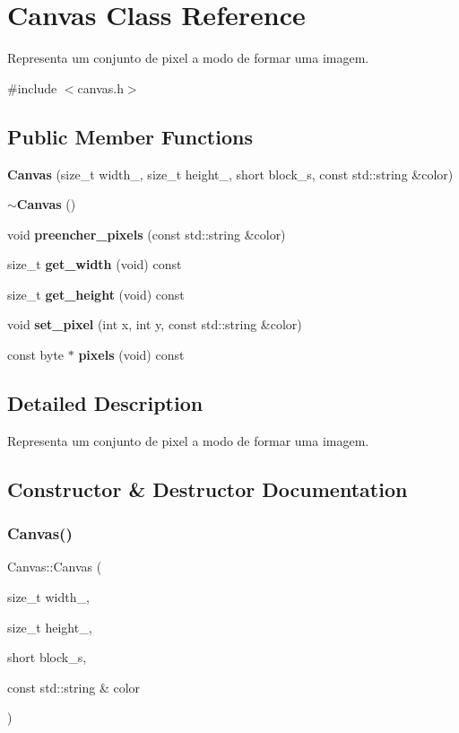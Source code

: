 \section{Canvas Class Reference}
\label{class_canvas}


Representa um conjunto de pixel a modo de formar uma imagem.  




{\ttfamily \#include $<$canvas.\+h$>$}

\subsection*{Public Member Functions}
\begin{DoxyCompactItemize}
\item 
\textbf{ Canvas} (size\+\_\+t width\+\_\+, size\+\_\+t height\+\_\+, short block\+\_\+s, const std\+::string \&color)
\item 
\textbf{ $\sim$\+Canvas} ()
\item 
void \textbf{ preencher\+\_\+pixels} (const std\+::string \&color)
\item 
size\+\_\+t \textbf{ get\+\_\+width} (void) const
\item 
size\+\_\+t \textbf{ get\+\_\+height} (void) const
\item 
void \textbf{ set\+\_\+pixel} (int x, int y, const std\+::string \&color)
\item 
const byte $\ast$ \textbf{ pixels} (void) const
\end{DoxyCompactItemize}


\subsection{Detailed Description}
Representa um conjunto de pixel a modo de formar uma imagem. 

\subsection{Constructor \& Destructor Documentation}
\mbox{\label{class_canvas_ac6561227188fd9b2488a3203ea10a48b}} 
\subsubsection{Canvas()}
{\footnotesize\ttfamily Canvas\+::\+Canvas (\begin{DoxyParamCaption}\item[{size\+\_\+t}]{width\+\_\+,  }\item[{size\+\_\+t}]{height\+\_\+,  }\item[{short}]{block\+\_\+s,  }\item[{const std\+::string \&}]{color }\end{DoxyParamCaption})\hspace{0.3cm}{\ttfamily [inline]}}

